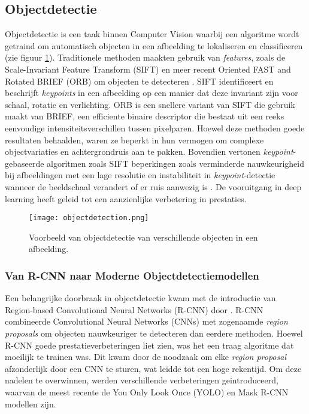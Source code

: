 \subsection{Objectdetectie}

Objectdetectie is een taak binnen Computer Vision waarbij een algoritme wordt getraind om automatisch objecten in een afbeelding te lokaliseren en classificeren (zie figuur \ref{fig:object-detection}).
Traditionele methoden maakten gebruik van \textit{features}, zoals de Scale-Invariant Feature Transform (SIFT) en meer recent Oriented FAST and Rotated BRIEF (ORB) om objecten te detecteren \autocite{Lindeberg2012, Rublee2011}.
SIFT identificeert en beschrijft \textit{keypoints} in een afbeelding op een manier dat deze invariant zijn voor schaal, rotatie en verlichting.
ORB is een snellere variant van SIFT die gebruik maakt van BRIEF, een efficiente binaire descriptor die bestaat uit een reeks eenvoudige intensiteitsverschillen tussen pixelparen.
Hoewel deze methoden goede resultaten behaalden, waren ze beperkt in hun vermogen om complexe objectvariaties en achtergrondruis aan te pakken. Bovendien vertonen \textit{keypoint}-gebaseerde algoritmen 
zoals SIFT beperkingen zoals verminderde nauwkeurigheid bij afbeeldingen met een lage resolutie en instabiliteit in \textit{keypoint}-detectie wanneer de beeldschaal verandert of er ruis aanwezig is \autocite{Ives2015}.
De vooruitgang in deep learning heeft geleid tot een aanzienlijke verbetering in prestaties.

\begin{figure}[H]
  \centering
  \texttt{[image: objectdetection.png]}
  \caption[]{\label{fig:object-detection}Voorbeeld van objectdetectie van verschillende objecten in een afbeelding.}
\end{figure}

\subsubsection{Van R-CNN naar Moderne Objectdetectiemodellen}

Een belangrijke doorbraak in objectdetectie kwam met de introductie van Region-based Convolutional Neural Networks (R-CNN) door \textcite{Girshick2014}.
R-CNN combineerde Convolutional Neural Networks (CNNs) met zogenaamde \textit{region proposals} om objecten nauwkeuriger te detecteren dan eerdere methoden.
Hoewel R-CNN goede prestatieverbeteringen liet zien, was het een traag algoritme dat moeilijk te trainen was. 
Dit kwam door de noodzaak om elke \textit{region proposal} afzonderlijk door een CNN te sturen, wat leidde tot een hoge rekentijd.
Om deze nadelen te overwinnen, werden verschillende verbeteringen geintroduceerd, waarvan de meest recente de You Only Look Once (YOLO) en Mask R-CNN modellen zijn.

